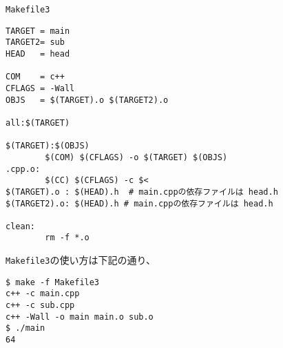 \begin{itembox}{\texttt{Makefile3}}
 \begin{verbatim}
TARGET = main
TARGET2= sub
HEAD   = head

COM    = c++
CFLAGS = -Wall
OBJS   = $(TARGET).o $(TARGET2).o

all:$(TARGET)

$(TARGET):$(OBJS)
        $(COM) $(CFLAGS) -o $(TARGET) $(OBJS)
.cpp.o:
        $(CC) $(CFLAGS) -c $<
$(TARGET).o : $(HEAD).h  # main.cppの依存ファイルは head.h
$(TARGET2).o: $(HEAD).h # main.cppの依存ファイルは head.h

clean:
        rm -f *.o\end{verbatim}
\end{itembox}
\texttt{Makefile3}の使い方は下記の通り、
\begin{verbatim}
$ make -f Makefile3
c++ -c main.cpp
c++ -c sub.cpp
c++ -Wall -o main main.o sub.o
$ ./main
64
\end{verbatim}